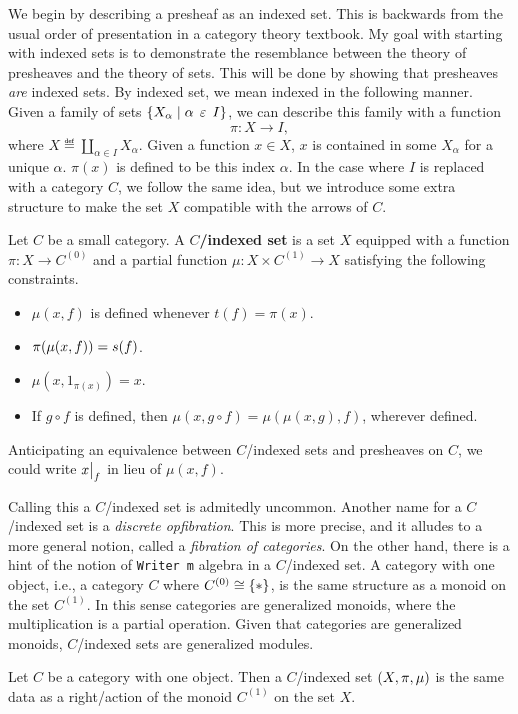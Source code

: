 \documentclass[../main.tex]{subfiles}
\begin{document}
We begin by describing a presheaf as an indexed set. This is backwards from the
usual order of presentation in a category theory textbook. My goal with starting
with indexed sets is to demonstrate the resemblance between the theory of
presheaves and the theory of sets. This will be done by showing that presheaves
\emph{are} indexed sets. By indexed set, we mean indexed in the following
manner. Given a family of sets \({\left\{ X_\alpha \mid \alpha \mathrel{\,\varepsilon\,} I \right\}}\), we can
describe this family with a function
\[%
  \pi : X \to I,
\]%
where \(X \eqdef \coprod_{\alpha \in I} X_\alpha\). Given a function \(x \in
X\), \(x\) is contained in some \(X_\alpha\) for a unique \(\alpha\). \(\pi(x)\)
is defined to be this index \(\alpha\). In the case where \(I\) is replaced with
a category \(C\), we follow the same idea, but we introduce some extra structure
to make the set \(X\) compatible with the arrows of \(C\).
\begin{definition}
  Let \(C\) be a small category. A \textbf{\(C\)\-/indexed set} is a set \(X\)
  equipped with a function \(\pi : X \to C^{(0)}\) and a partial function
  \(\mu : X \times C^{(1)} \to X\) satisfying the following constraints.
  \begin{itemize}
  \item \(\mu(x,f)\) is defined whenever \(t(f) = \pi(x)\).
  \item \(\pi{\left(\mu(x,f)\right)} = s(f)\).
  \item \(\mu(x,1_{\pi(x)}) = x\).
  \item If \(g \circ f\) is defined, then \(\mu(x,g\circ f) =
    \mu(\mu(x,g),f)\), wherever defined.
  \end{itemize}
  Anticipating an equivalence between \(C\)\-/indexed sets and presheaves on
  \(C\), we could write \(\restr{x}{f}\) in lieu of \(\mu(x,f)\).
\end{definition}
Calling this a \(C\)\-/indexed set is admitedly uncommon. Another name for a
\(C\)\-/indexed set is a \emph{discrete opfibration}. This is more precise, and
it alludes to a more general notion, called a \emph{fibration of categories}. On
the other hand, there is a hint of the notion of \texttt{Writer m} algebra in a
\(C\)\-/indexed set. A category with one object, i.e., a category \(C\) where
\(C^{(0)} \cong {\left\{\ast\right\}}\), is the same structure as a monoid on the set
\(C^{(1)}\). In this sense categories are generalized monoids, where the
multiplication is a partial operation. Given that categories are generalized
monoids, \(C\)\-/indexed sets are generalized modules.
\begin{proposition}
  Let \(C\) be a category with one object. Then a \(C\)\-/indexed set
  \({\left(X,\pi,\mu\right)}\) is the same data as a right\-/action of the monoid
  \(C^{(1)}\) on the set \(X\).
\end{proposition}
\end{document}
